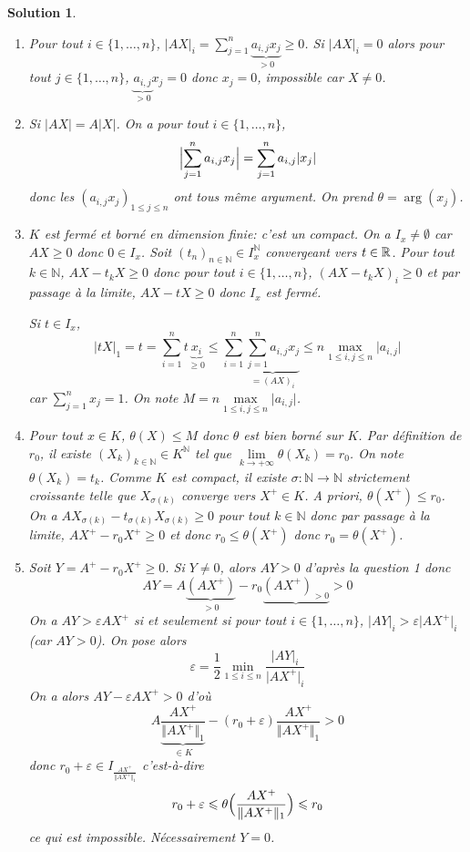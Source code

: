 \documentclass[12pt]{article}
\newtheorem{solution}{Solution}[section]
\theoremstyle{remark}
\newcommand{\N}{\mathbb{N}} \newcommand{\Z}{\mathbb{Z}}
\begin{document}
\begin{solution}
	\phantom{}
	\begin{enumerate}
		\item Pour tout $i\in\{1,\dots,n\}$, $\vert AX\vert_{i}=\sum_{j=1}^{n}\underbrace{a_{i,j}x_{j}}_{>0}\geqslant0$. Si $\vert AX\vert_{i}=0$ alors pour tout $j\in\{1,\dots,n\}$, $\underbrace{a_{i,j}}_{>0}x_{j}=0$ donc $x_{j}=0$, impossible car $X\neq 0$.
		
		\item Si $\vert AX\vert=A\vert X\vert$. On a pour tout $i\in\{1,\dots,n\}$,
		$$\Bigl\lvert\sum_{j=1}^{n}a_{i,j}x_{j}\Bigr\rvert=\sum_{j=1}^{n}a_{i,j}\lvert x_{j}\rvert$$
		donc les $(a_{i,j}x_{j})_{1\leqslant j\leqslant n}$ ont tous même argument. On prend $\theta=\arg(x_{j})$.

		\item $K$ est fermé et borné en dimension finie: c'est un compact. On a $I_{x}\neq\emptyset$ car $AX\geqslant0$ donc $0\in I_{x}$. Soit $(t_{n})_{n\in\N}\in I_{x}^{\N}$ convergeant vers $t\in\mathbb{R}$. Pour tout $k\in\N$, $AX-t_{k}X\geqslant0$ donc pour tout $i\in\{1,\dots,n\}$, $(AX-t_{k}X)_{i}\geqslant0$ et par passage à la limite, $AX-tX\geqslant0$ donc $I_{x}$ est fermé.
		
		Si $t\in I_{x}$, 
		$$\vert tX\vert_{1}=t=\sum_{i=1}^{n}t\underbrace{x_{i}}_{\geqslant0}\leqslant\sum_{i=1}^{n}\underbrace{\sum_{j=1}^{n}a_{i,j}x_{j}}_{=(AX)_{i}}\leqslant n\max\limits_{1\leqslant i,j\leqslant n}\vert a_{i,j}\vert$$
		car $\sum_{j=1}^{n}x_{j}=1$.
		On note $M=n\max\limits_{1\leqslant i,j\leqslant n}\vert a_{i,j}\vert$.

		\item Pour tout $x\in K$, $\theta(X)\leqslant M$ donc $\theta$ est bien borné sur $K$. Par définition de $r_{0}$, il existe $(X_{k})_{k\in\N}\in K^{\N}$ tel que $\lim\limits_{k\to+\infty}\theta(X_k)=r_{0}$. On note $\theta(X_{k})=t_{k}$. Comme $K$ est compact, il existe $\sigma\colon\N\to\N$ strictement croissante telle que $X_{\sigma(k)}$ converge vers $X^{+}\in K$. A priori, $\theta(X^{+})\leqslant r_{0}$. On a $AX_{\sigma(k)}-t_{\sigma(k)}X_{\sigma(k)}\geqslant0$ pour tout $k\in\N$ donc par passage à la limite, $AX^{+}-r_{0}X^{+}\geqslant0$ et donc $r_{0}\leqslant\theta(X^{+})$ donc $r_{0}=\theta(X^{+})$.
		
		\item Soit $Y=A^{+}-r_{0}X^{+}\geqslant0$. Si $Y\neq0$, alors $AY>0$ d'après la question 1 donc 
		$$AY=A\underbrace{(AX^{+})}_{>0}-r_{0}\underbrace{(AX^{+})_{>0}}>0$$
		On a $AY>\varepsilon AX^{+}$ si et seulement si pour tout $i\in\{1,\dots,n\}$, $\vert AY\vert_{i}>\varepsilon\vert AX^{+}\vert_{i}$ (car $AY>0$). On pose alors 
		$$\varepsilon=\frac{1}{2}\min\limits_{1\leqslant i\leqslant n}\frac{\vert AY\vert_{i}}{\vert AX^{+}\vert_{i}}$$
		On a alors $AY-\varepsilon AX^{+}>0$ d'où 
		$$A\underbrace{\frac{AX^{+}}{\Vert AX^{+}\Vert_{1}}}_{\in K}-(r_{0}+\varepsilon)\frac{AX^{+}}{\Vert AX^{+}\Vert_{1}}>0$$
		donc $r_{0}+\varepsilon\in I_{\frac{AX^{+}}{\Vert AX^{+}\Vert_{1}}}$ c'est-à-dire 
		$$r_{0}+\varepsilon\leqslant\theta\Bigl(\frac{AX^{+}}{\Vert AX^{+}\Vert_{1}}\Bigr)\leqslant r_{0}$$
		ce qui est impossible. Nécessairement $Y=0$.


\end{enumerate}
\end{solution}
\end{document}

